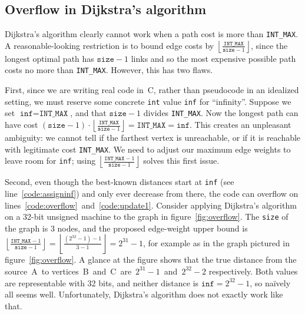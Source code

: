 \subsection{Overflow in Dijkstra's algorithm}
\label{sec:dijkoverflow}

Dijkstra's algorithm clearly cannot work when a path
cost is more than \texttt{INT\_MAX}.  A reasonable-looking restriction
is to bound edge costs by
$\left\lfloor\frac{\texttt{INT\_MAX}}{\texttt{size}-1}\right\rfloor$, since
the longest optimal path has $\texttt{size}-1$ links and so the
most expensive possible path costs no more than \texttt{INT\_MAX}.
However, this has two flaws.

First, since we are writing real code in~C,
rather than pseudocode in an idealized setting, we must reserve some
concrete \texttt{int} value \texttt{inf} for ``infinity''.  Suppose we
set $\texttt{inf}=\texttt{INT\_MAX}$, and that $\texttt{size}-1$ divides \texttt{INT\_MAX}.  Now the longest path can have cost $(\texttt{size}-1)\cdot\left\lfloor\frac{\texttt{INT\_MAX}}{\texttt{size}-1}\right\rfloor = \texttt{INT\_MAX} = \texttt{inf}$.  This creates an unpleasant ambiguity: we cannot tell if the farthest vertex is unreachable, or if it is reachable with legitimate cost \texttt{INT\_MAX}.  We need to adjust our maximum edge weights to leave room for \texttt{inf}; using $\left\lfloor\frac{\texttt{INT\_MAX}-1}{\texttt{size}-1}\right\rfloor$ solves this first issue.



Second, even though the best-known distances start at \texttt{inf}
(see line~\ref{code:assigninf}) and only ever decrease from there, the code can
overflow on lines~\ref{code:overflow}~and~\ref{code:update1}.
Consider applying Dijkstra's algorithm on a 32-bit unsigned machine to
the graph in figure~\ref{fig:overflow}.  The \texttt{size} of the graph is 3 nodes, and the proposed edge-weight upper bound is $\left\lfloor\frac{\texttt{INT\_MAX}-1}{\texttt{size}-1}\right\rfloor = \left\lfloor\frac{(2^{32}-1)-1}{3-1}\right\rfloor = 2^{31}-1$, for example as in the graph pictured in figure~\ref{fig:overflow}.  A glance at the figure shows that the true distance from the source~A~to vertices~B~and~C~are~$2^{31}-1$~and~$2^{32}-2$ respectively. Both values are representable with 32 bits, and neither distance is $\texttt{inf}=2^{32}-1$, so na\"ively all seems well. Unfortunately, Dijkstra's algorithm does not exactly work like that.


